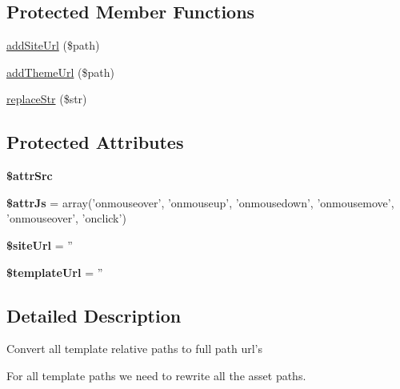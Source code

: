 \subsection*{Protected Member Functions}
\begin{DoxyCompactItemize}
\item 
\hyperlink{classTk_1_1Dom_1_1Modifier_1_1Filter_1_1Path_a31338a94fb7647af396257aeb021434a}{add\+Site\+Url} (\$path)
\item 
\hyperlink{classTk_1_1Dom_1_1Modifier_1_1Filter_1_1Path_ab041274814f594f35c5ff7bcb53ee194}{add\+Theme\+Url} (\$path)
\item 
\hyperlink{classTk_1_1Dom_1_1Modifier_1_1Filter_1_1Path_a7bfcedf5deb9b380aa1fa3a9c1e618cb}{replace\+Str} (\$str)
\end{DoxyCompactItemize}
\subsection*{Protected Attributes}
\begin{DoxyCompactItemize}
\item 
{\bfseries \$attr\+Src}
\item 
\hypertarget{classTk_1_1Dom_1_1Modifier_1_1Filter_1_1Path_a4a97acb9a3da1a93a4d643c9db90c024}{{\bfseries \$attr\+Js} = array('onmouseover', 'onmouseup', 'onmousedown', 'onmousemove', 'onmouseover', 'onclick')}\label{classTk_1_1Dom_1_1Modifier_1_1Filter_1_1Path_a4a97acb9a3da1a93a4d643c9db90c024}

\item 
\hypertarget{classTk_1_1Dom_1_1Modifier_1_1Filter_1_1Path_ac1fb774284ffc62c061b7826b54021c3}{{\bfseries \$site\+Url} = ''}\label{classTk_1_1Dom_1_1Modifier_1_1Filter_1_1Path_ac1fb774284ffc62c061b7826b54021c3}

\item 
\hypertarget{classTk_1_1Dom_1_1Modifier_1_1Filter_1_1Path_aa1b548430d9906c228ea1db3ea0a6d89}{{\bfseries \$template\+Url} = ''}\label{classTk_1_1Dom_1_1Modifier_1_1Filter_1_1Path_aa1b548430d9906c228ea1db3ea0a6d89}

\end{DoxyCompactItemize}


\subsection{Detailed Description}
Convert all template relative paths to full path url's

For all template paths we need to rewrite all the asset paths.

